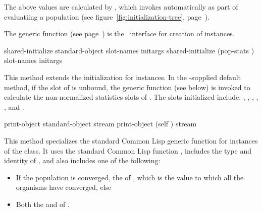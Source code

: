 {	The above values are calculated by , which
	\geco{} invokes automatically as part of evaluatiing a population (see
	figure~\ref{fig:initialization-tree}, page~\pageref{fig:initialization-tree}).
	
	\gap
	
	\filbreak
	
	{\samepage
		
		The generic function  (see
		page~\pageref{method:make-population-statistics}) is the \geco\ interface for creation of
		 instances.
	\par}%
		
	\gap
	
	\filbreak

	{\samepage

	
		\Eggeneric shared-initialize {standard-object slot-names \rest initargs}
		 shared-initialize {(pop-stats ) slot-names \rest initargs}
	
		This method extends the initialization for  instances.
		In the \geco-supplied default method, if the  slot of 
		 is unbound, the  generic function
		(see below) is invoked to calculate the non-normalized statistics slots of 
		.
		The slots initialized include: , , ,
		, , and .
	\par}%
	
	\filbreak
	{\samepage
		\Eggeneric print-object {standard-object stream}
		 print-object {(self ) stream}
		
		This method specializes the standard Common Lisp  generic function for
		instances of the  class. It uses the standard Common Lisp
		function , includes the type and identity of , and
		also includes one of the following:
		\begin{itemize}
			\item If the population is converged, the  of
			, which is the value to which all the organisms have
			converged, else
			\item Both the  and  of 
			.
		\end{itemize}
	\par}%
	
}
